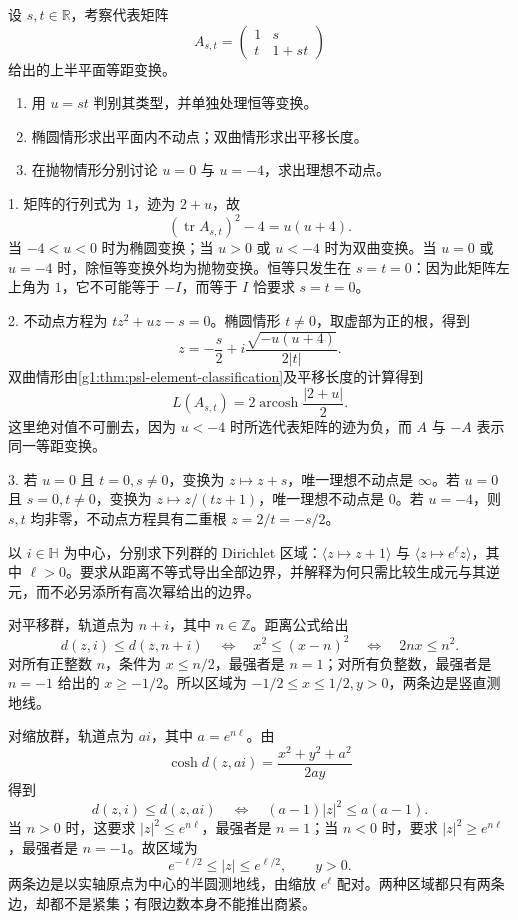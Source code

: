 \begin{exercise}\label{g1:ex:psl-parameter-family}
	设 \(s,t\in\mathbb R\)，考察代表矩阵
	\[
		A_{s,t}=\begin{pmatrix}1&s\\t&1+st\end{pmatrix}
	\]
	给出的上半平面等距变换。
	\begin{enumerate}
		\item 用 \(u=st\) 判别其类型，并单独处理恒等变换。
		\item 椭圆情形求出平面内不动点；双曲情形求出平移长度。
		\item 在抛物情形分别讨论 \(u=0\) 与 \(u=-4\)，求出理想不动点。
	\end{enumerate}
\end{exercise}
\begin{solution}
	1. 矩阵的行列式为 \(1\)，迹为 \(2+u\)，故
	\[
		(\operatorname{tr}A_{s,t})^2-4=u(u+4).
	\]
	当 \(-4<u<0\) 时为椭圆变换；当 \(u>0\) 或 \(u<-4\) 时为双曲变换。当 \(u=0\) 或 \(u=-4\) 时，除恒等变换外均为抛物变换。恒等只发生在 \(s=t=0\)：因为此矩阵左上角为 \(1\)，它不可能等于 \(-I\)，而等于 \(I\) 恰要求 \(s=t=0\)。

	2. 不动点方程为 \(tz^2+uz-s=0\)。椭圆情形 \(t\ne0\)，取虚部为正的根，得到
	\[
		z=-\frac s2+i\frac{\sqrt{-u(u+4)}}{2|t|}.
	\]
	双曲情形由\cref{g1:thm:psl-element-classification}及平移长度的计算得到
	\[
		L(A_{s,t})=2\operatorname{arcosh}\frac{|2+u|}{2}.
	\]
	这里绝对值不可删去，因为 \(u<-4\) 时所选代表矩阵的迹为负，而 \(A\) 与 \(-A\) 表示同一等距变换。

	3. 若 \(u=0\) 且 \(t=0,s\ne0\)，变换为 \(z\mapsto z+s\)，唯一理想不动点是 \(\infty\)。若 \(u=0\) 且 \(s=0,t\ne0\)，变换为 \(z\mapsto z/(tz+1)\)，唯一理想不动点是 \(0\)。若 \(u=-4\)，则 \(s,t\) 均非零，不动点方程具有二重根 \(z=2/t=-s/2\)。
\end{solution}

\begin{exercise}\label{g1:ex:cyclic-dirichlet-domains}
	以 \(i\in\mathbb H\) 为中心，分别求下列群的 Dirichlet 区域：\(\langle z\mapsto z+1\rangle\) 与 \(\langle z\mapsto e^\ell z\rangle\)，其中 \(\ell>0\)。要求从距离不等式导出全部边界，并解释为何只需比较生成元与其逆元，而不必另添所有高次幂给出的边界。
\end{exercise}
\begin{solution}
	对平移群，轨道点为 \(n+i\)，其中 \(n\in\mathbb Z\)。距离公式给出
	\[
		d(z,i)\le d(z,n+i)
		\quad\Longleftrightarrow\quad x^2\le(x-n)^2
		\quad\Longleftrightarrow\quad 2nx\le n^2.
	\]
	对所有正整数 \(n\)，条件为 \(x\le n/2\)，最强者是 \(n=1\)；对所有负整数，最强者是 \(n=-1\) 给出的 \(x\ge-1/2\)。所以区域为 \(-1/2\le x\le1/2,y>0\)，两条边是竖直测地线。

	对缩放群，轨道点为 \(ai\)，其中 \(a=e^{n\ell}\)。由
	\[
		\cosh d(z,ai)=\frac{x^2+y^2+a^2}{2ay}
	\]
	得到
	\[
		d(z,i)\le d(z,ai)
		\quad\Longleftrightarrow\quad(a-1)|z|^2\le a(a-1).
	\]
	当 \(n>0\) 时，这要求 \(|z|^2\le e^{n\ell}\)，最强者是 \(n=1\)；当 \(n<0\) 时，要求 \(|z|^2\ge e^{n\ell}\)，最强者是 \(n=-1\)。故区域为
	\[
		e^{-\ell/2}\le|z|\le e^{\ell/2},\qquad y>0.
	\]
	两条边是以实轴原点为中心的半圆测地线，由缩放 \(e^\ell\) 配对。两种区域都只有两条边，却都不是紧集；有限边数本身不能推出商紧。
\end{solution}

